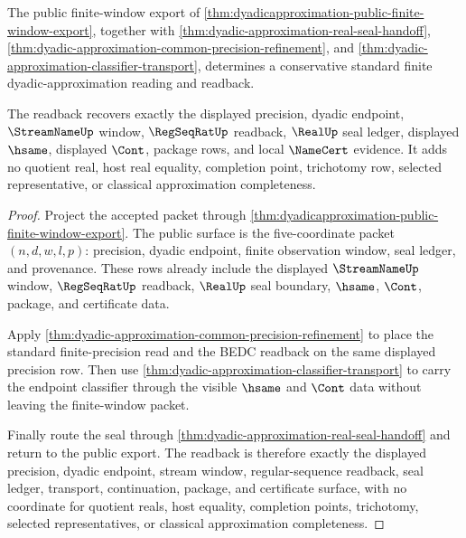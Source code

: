 \begin{theorem}\label{thm:dyadic-approximation-standard-finite-approximation-bridge}
The public finite-window export of
\autoref{thm:dyadicapproximation-public-finite-window-export}, together with
\autoref{thm:dyadic-approximation-real-seal-handoff},
\autoref{thm:dyadic-approximation-common-precision-refinement}, and
\autoref{thm:dyadic-approximation-classifier-transport}, determines a
conservative standard finite dyadic-approximation reading and readback.

The readback recovers exactly the displayed precision, dyadic endpoint,
$\StreamNameUp$ window, $\RegSeqRatUp$ readback, $\RealUp$ seal ledger,
displayed $\hsame$, displayed $\Cont$, package rows, and local $\NameCert$
evidence. It adds no quotient real, host real equality, completion point,
trichotomy row, selected representative, or classical approximation
completeness.
\end{theorem}
\begin{proof}
Project the accepted packet through
\autoref{thm:dyadicapproximation-public-finite-window-export}. The public
surface is the five-coordinate packet $(n,d,w,l,p)$: precision, dyadic
endpoint, finite observation window, seal ledger, and provenance. These rows
already include the displayed $\StreamNameUp$ window, $\RegSeqRatUp$ readback,
$\RealUp$ seal boundary, $\hsame$, $\Cont$, package, and certificate data.

Apply \autoref{thm:dyadic-approximation-common-precision-refinement} to place
the standard finite-precision read and the BEDC readback on the same displayed
precision row. Then use
\autoref{thm:dyadic-approximation-classifier-transport} to carry the endpoint
classifier through the visible $\hsame$ and $\Cont$ data without leaving the
finite-window packet.

Finally route the seal through
\autoref{thm:dyadic-approximation-real-seal-handoff} and return to the public
export. The readback is therefore exactly the displayed precision, dyadic
endpoint, stream window, regular-sequence readback, seal ledger, transport,
continuation, package, and certificate surface, with no coordinate for
quotient reals, host equality, completion points, trichotomy, selected
representatives, or classical approximation completeness.
\end{proof}

